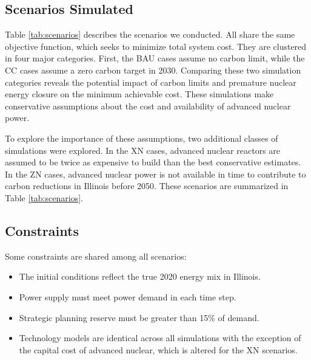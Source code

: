 \FloatBarrier
\subsection{Scenarios Simulated}\label{sec:simulations}

Table \ref{tab:scenarios} describes the scenarios we conducted.
All share the same objective function, which seeks to minimize total system cost.
They are clustered in four major categories. First, the \gls{BAU} cases assume 
no carbon limit, while the \gls{CC} cases assume a zero 
carbon target in 2030. Comparing these two simulation categories reveals the 
potential impact of carbon limits and premature nuclear energy closure on 
the minimum achievable cost. These simulations make conservative assumptions 
about the cost and availability of advanced nuclear power. 

To explore the importance of these assumptions, two additional classes of 
simulations were explored. In the \gls{XN} cases, advanced 
nuclear reactors are assumed to be twice as expensive to build than the best 
conservative estimates. In the \gls{ZN} cases, advanced 
nuclear power is not available in time to contribute to carbon reductions in 
Illinois before 2050. These scenarios are summarized in Table 
\ref{tab:scenarios}. 





\FloatBarrier
\subsection{Constraints}
Some constraints are shared among all scenarios:
\begin{itemize}
        \item The initial conditions reflect the true 2020 energy mix in Illinois.
        \item Power supply must meet power demand in each time step.
        \item Strategic planning reserve must be greater than 15\% of demand.
        \item Technology models are identical across all simulations with the 
                exception of the capital cost of advanced nuclear, which is 
                altered for the \gls{XN} scenarios.  
\end{itemize}


